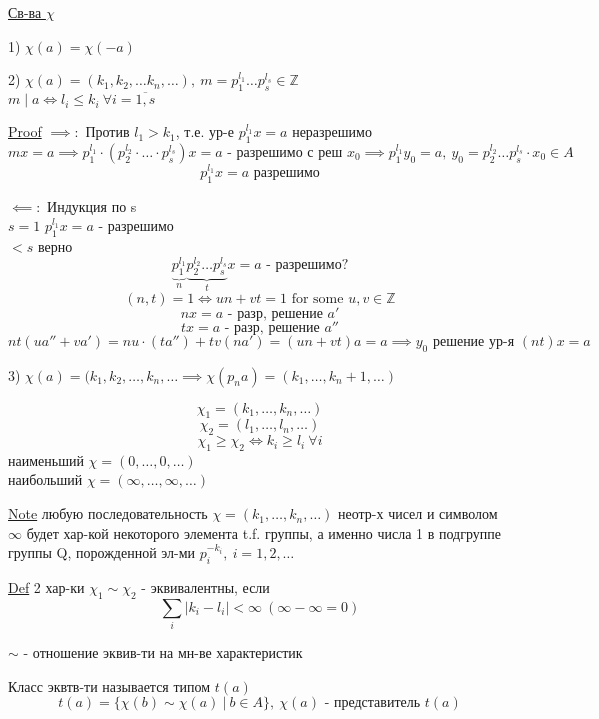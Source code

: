 \documentclass[a4paper]{article}
\begin{document}
\begin{tcolorbox}
\underline{Св-ва $ \chi $}

1) $ \chi(a) = \chi(-a) $ 

2) $ \chi(a) = (k_1, k_2, \dots k_n, \dots), \ m = p_1^{l_1}\dots p_s^{l_s} \in \mathbb{Z} $ \\
$ m \mid a \iff l_i \leq k_i \ \forall i = \overline{1,s} $ 

\underline{Proof} $ \implies: $ Против $ l_1 > k_1 $, т.е. ур-е $ p_1^{l_1}x = a $ 
неразрешимо
\[
    mx = a \implies p_1^{l_1} \cdot (p_2^{l_2} \cdot \dots \cdot p_s^{l_s}) x
    = a \text{ - разрешимо с реш }x_0 \implies p_1^{l_1}y_0 = a, \ y_0 = p_2^{l_2}
    \dots p_s^{l_s} \cdot x_0 \in A
\]
\[
    p_1^{l_1}x = a \text{ разрешимо}
\]

$ \impliedby: $ Индукция по s\\
$s = 1$ $ p_1^{l_1}x = a $ - разрешимо\\
$ < s $ верно
\[
    \underbrace{p_1^{l_1}}_{n}\underbrace{p_2^{l_2} \dots p_s^{l_s}}_{t} x = a
    \text{ - разрешимо?}
\]
\[
    (n,t) = 1 \iff un + vt = 1 \text{ for some } u,v \in \mathbb{Z}
\]
\[
    nx = a \text{ - разр, решение }a'
\]
\[
    tx = a \text{ - разр, решение }a''
\]
\[
    nt(ua'' + v a') = nu \cdot (ta'') + tv(na') = (un + vt)a = a \implies
    y_0 \text{ решение ур-я } (nt)x = a
\]

3) $ \chi(a) = (k_1, k_2, \dots, k_n, \dots \implies \chi(p_n a) = (k_1, \dots,
k_n + 1, \dots)$ 

\end{tcolorbox}

\[
    \chi_1 = (k_1, \dots, k_n, \dots)
\]
\[
    \chi_2 = (l_1, \dots, l_n, \dots)
\]
\[
    \chi_1 \geq \chi_2 \iff k_i \geq l_i \ \forall i
\]
наименьший $ \chi = (0, \dots, 0, \dots) $ \\
наибольший $ \chi = (\infty, \dots, \infty, \dots) $ 

\begin{tcolorbox}
\underline{Note} любую последовательность $ \chi = (k_1, \dots, k_n, \dots) $ 
неотр-х чисел и символом $ \infty $ будет хар-кой некоторого элемента t.f. группы,
а именно числа 1 в подгруппе группы Q, порожденной эл-ми $ p_i^{-k_i}, \ i = 1,
2, \dots$ 
\end{tcolorbox}

\begin{tcolorbox}
\underline{Def} 2 хар-ки $ \chi_1 \sim \chi_2 $ - эквивалентны, если
\[
    \sum_{i} |k_i - l_i| < \infty \ (\infty - \infty = 0)
\]

$ \sim $ - отношение эквив-ти на мн-ве характеристик

Класс эквтв-ти называется типом $ t(a) $ 
\[
    t(a) = \{ \chi(b) \sim \chi(a) \ | \ b \in A \}, \ \chi(a) \text{ - представитель }
    t(a)
\]
\end{tcolorbox}
\end{document}
